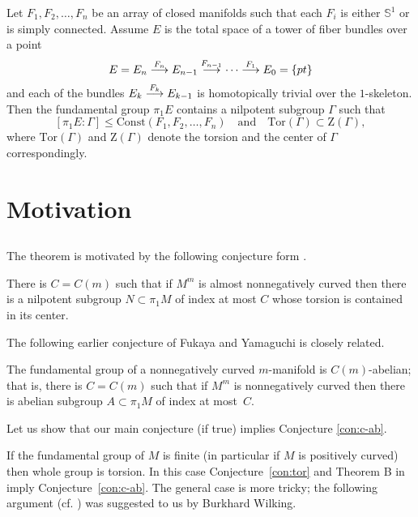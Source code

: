 \documentclass{amsart}
\begin{document}
\begin{thm}\label{thm:smooth}
Let $F_1,F_2,\dots,F_n$ be an array of closed manifolds 
such that each $F_i$ is either $\mathbb{S}^{1}$ or is simply connected. 
Assume $E$ is the total space of a tower of fiber bundles over a point
$$E=E_n\buildrel {F_n}\over \longrightarrow E_{n-1}\buildrel {F_{n-1}}\over\longrightarrow\dots\buildrel {F_1}\over\longrightarrow E_0=\{pt\}$$
and each of the bundles $E_k\buildrel {F_k}\over \longrightarrow E_{k-1}$ is homotopically trivial over the $1$-skeleton. 
Then the fundamental group $\pi_1E$ contains a nilpotent subgroup $\Gamma$ such that
$$[\pi_1E:\Gamma]\le \mathrm{Const}(F_1,F_2,\dots,F_n)\quad\text{and}\quad\mathrm{Tor}(\Gamma)\subset \mathrm{Z}(\Gamma),$$
where $\mathrm{Tor}(\Gamma)$ and $\mathrm{Z}(\Gamma)$ denote the torsion and the center of $\Gamma$ correspondingly.
\end{thm}

\section{Motivation}

\subsection{} The theorem is motivated by the following conjecture form \cite{KPT}.

\begin{mconj}\label{con:tor}
There is $C=C(m)$ such that if $M^m$ is almost nonnegatively curved then there is a nilpotent subgroup $N\subset \pi_1M$ of index  at most $C$ whose torsion is contained in its center.
\end{mconj}

The following earlier conjecture of Fukaya and Yamaguchi \cite{FY} is closely related.

\begin{conj}\label{con:c-ab}
The fundamental group of a nonnegatively curved  $m$-manifold is $C(m)$-abelian;
that is, there is $C=C(m)$ such that if $M^m$ is nonnegatively curved then there is abelian subgroup $A\subset \pi_1M$ of index  at most~$C$.
\end{conj}

Let us show that our main conjecture (if true) implies Conjecture \ref{con:c-ab}.

If the fundamental group of $M$ is finite (in particular if $M$ is positively curved) then whole group is torsion.
In this case Conjecture~\ref{con:tor} and Theorem B in \cite{KPT} imply Conjecture~\ref{con:c-ab}.
The general case is more tricky;
the following argument (cf. \cite[Corollary 4.6.1]{KPT}) was suggested to us by Burkhard Wilking.
\end{document}
